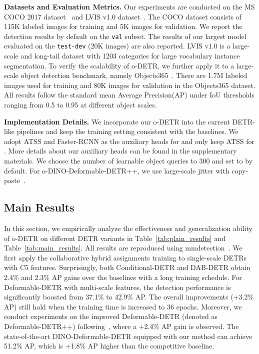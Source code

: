 \vspace{1mm}
\noindent\textbf{Datasets and Evaluation Metrics.}
Our experiments are conducted on the MS COCO 2017 dataset~\cite{coco} and LVIS v1.0 dataset~\cite{lvis}. The COCO dataset consists of 115K labeled images for training and 5K images for validation. 
We report the detection results by default on the \texttt{val} subset. 
The results of our largest model evaluated on the \texttt{test-dev} (20K images) are also reported. 
LVIS v1.0 is a large-scale and long-tail dataset with 1203 categories for large vocabulary instance segmentation.
To verify the scalability of o-DETR, we further apply it to a large-scale object detection benchmark, namely Objects365~\cite{objects365}. 
There are 1.7M labeled images used for training and 80K images for validation in the Objects365 dataset. 
All results follow the standard mean Average Precision(AP) under IoU thresholds ranging from 0.5 to 0.95 at different object scales.

\vspace{1mm}
\noindent\textbf{Implementation Details.}
We incorporate our o-DETR into the current DETR-like pipelines and keep the training setting consistent with the baselines.
We adopt ATSS and Faster-RCNN as the auxiliary heads for  and only keep ATSS for .
More details about our auxiliary heads can be found in the supplementary materials. 
We choose the number of learnable object queries to 300 and set  to  by default.
For o-DINO-Deformable-DETR++, we use large-scale jitter with copy-paste~\cite{copypaste}.




\subsection{Main Results}
In this section, we empirically analyze the effectiveness and generalization ability of o-DETR on different DETR variants in Table~\ref{tab:plain_results} and Table~\ref{tab:main_results}.
All results are reproduced using mmdetection~\cite{mmdet}.
We first apply the collaborative hybrid assignments training to single-scale DETRs with C5 features.
Surprisingly, both Conditional-DETR and DAB-DETR obtain 2.4\% and 2.3\% AP gains over the baselines with a long training schedule.
For Deformable-DETR with multi-scale features, the detection performance is significantly boosted from 37.1\% to 42.9\% AP.
The overall improvements (+3.2\% AP) still hold when the training time is increased to 36 epochs.
Moreover, we conduct experiments on the improved Deformable-DETR (denoted as Deformable-DETR++) following~\cite{hybrid}, where a +2.4\% AP gain is observed.
The state-of-the-art DINO-Deformable-DETR equipped with our method can achieve 51.2\% AP, which is +1.8\% AP higher than the competitive baseline. 


